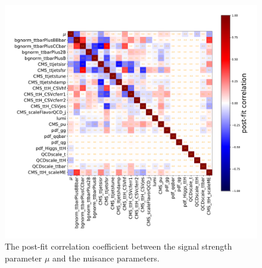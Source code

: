 \begin{figure}
\begin{centering}
\includegraphics[width = 1.0\textwidth]{figures/tth/nuis_corr.pdf}
\caption[The post-fit correlation between the signal strength parameter and the nuisance parameters]{The post-fit correlation coefficient between the signal strength parameter $\mu$ and the nuisance parameters.}
\label{fig:tth_corr}
\end{centering}
\end{figure}

